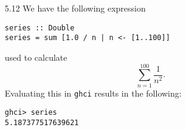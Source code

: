 \documentclass{article}
\begin{document}
\begin{itemize}
\begin{verbatim}
[0.0,3.0,6.0]
ghci> [0,3..7.499999999]
[0.0,3.0,6.0]
ghci> [0,3..7]
[0,3,6]
ghci> [0,3..8]
[0,3,6]
ghci> [0,3..9]
[0,3,6,9]
        \end{verbatim}
        \item[5.12] We have the following expression 
        \begin{verbatim}
series :: Double
series = sum [1.0 / n | n <- [1..100]]
        \end{verbatim}
        used to calculate
        \[
            \sum_{n=1}^{100} \frac{1}{n^2}.
        \]
        Evaluating this in \verb|ghci| results in the following:
        \begin{verbatim}
ghci> series
5.187377517639621
        \end{verbatim}
    \end{itemize}
\end{document}
